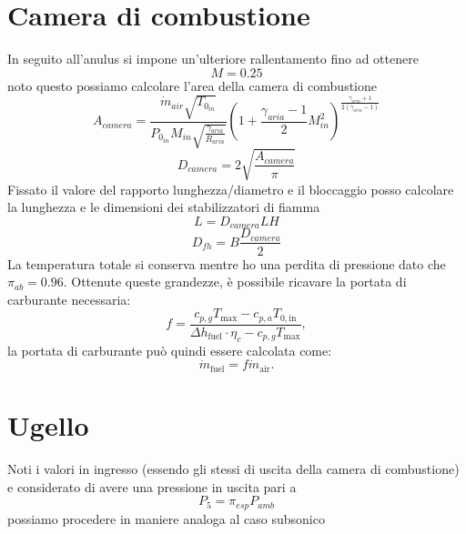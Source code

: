 \section{Camera di combustione}
In seguito all'anulus si impone un'ulteriore rallentamento fino ad ottenere \[M=0.25\] noto questo possiamo calcolare l'area della camera di combustione
\begin{equation*}
    A_{{camera}} = \frac{\dot{m}_{air} \sqrt{T_{0_{in}}}}{P_{0_{in}} M_{in} \sqrt{\frac{\gamma_{aria}}{R_{aria}}}} \left( 1 + \frac{\gamma_{aria}-1}{2} M_{in}^2 \right)^{\frac{\gamma_{aria}+1}{2(\gamma_{aria}-1)}}
\end{equation*}
\begin{equation*}
    D_{camera}=2\sqrt{\frac{A_{camera}}{\pi}}
\end{equation*}
Fissato il valore del rapporto lunghezza/diametro  e il bloccaggio  posso calcolare la lunghezza e le dimensioni dei stabilizzatori di fiamma
\begin{equation*}
    L=D_{camera}LH
\end{equation*}
\begin{equation*}
    D_{fh}=B\frac{D_{camera}}{2}
\end{equation*}
La temperatura totale si conserva mentre ho una perdita di pressione dato che $\pi_{ab}=0.96$. Ottenute queste grandezze, è possibile ricavare la portata di carburante necessaria:
\begin{equation*}
    f = \frac{c_{p,g} T_{\max} - c_{p,a} T_{0,\text{in}}}{\Delta h_{\text{fuel}} \cdot \eta_c - c_{p,g} T_{\max}},
    \label{eq:rapporto_f}
\end{equation*}
la portata di carburante può quindi essere calcolata come:
\begin{equation*}
    \dot{m}_{\text{fuel}} = f \dot{m}_{\text{air}}.
    \label{eq:portata_fuel}
\end{equation*}




\section{Ugello}
Noti i valori in ingresso (essendo gli stessi di uscita della camera di combustione) e considerato di avere una pressione in uscita pari a \[P_5=\pi_{esp}P_{amb}\] possiamo procedere in maniere analoga al caso subsonico

